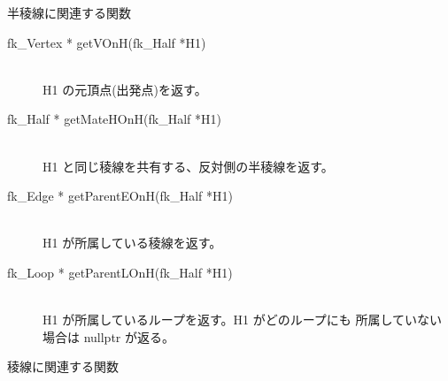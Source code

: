 \begin{center}
{\large 半稜線に関連する関数}
\end{center}
\begin{description}
 \item[\hspace*{0.6cm}fk\_Vertex * getVOnH(fk\_Half *H1)] ~ \\
	H1 の元頂点(出発点)を返す。		

 \item[\hspace*{0.6cm}fk\_Half * getMateHOnH(fk\_Half *H1)] ~ \\
	H1 と同じ稜線を共有する、反対側の半稜線を返す。		

 \item[\hspace*{0.6cm}fk\_Edge * getParentEOnH(fk\_Half *H1)] ~ \\
	H1 が所属している稜線を返す。

 \item[\hspace*{0.6cm}fk\_Loop * getParentLOnH(fk\_Half *H1)] ~ \\
	H1 が所属しているループを返す。H1 がどのループにも
	所属していない場合は nullptr が返る。
\end{description}
\begin{center}
{\large 稜線に関連する関数}
\end{center}
